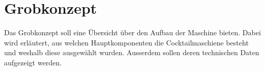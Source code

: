 \section{Grobkonzept}\label{sec:Grobkonzept}

Das Grobkonzept soll eine Übersicht über den Aufbau der Maschine bieten. Dabei wird erläutert, aus welchen Hauptkomponenten die Cocktailmaschiene besteht und weshalb diese ausgewählt wurden. Ausserdem sollen deren technischen Daten aufgezeigt werden. 

